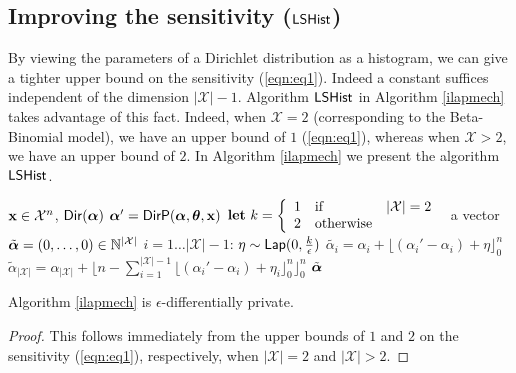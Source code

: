 \documentclass{article}
\begin{document}
\subsection{Improving the sensitivity ($\ilapmech$)}
\label{sec_ell1_hist}
By viewing the parameters of a Dirichlet distribution as a histogram, we can give a tighter upper bound on the sensitivity (\ref{eqn:eq1}).
Indeed a constant suffices independent of the dimension $|\mathcal{X}| - 1$. Algorithm $\ilapmech$ in Algorithm \ref{ilapmech} takes advantage of this fact. 
Indeed, when $\mathcal{X}=2$ (corresponding to the Beta-Binomial model), we have an upper bound of $1$ (\ref{eqn:eq1}), whereas when $\mathcal{X}>2$, we have an upper bound of $2$.
In Algorithm \ref{ilapmech} we present the algorithm $\ilapmech$.
\begin{algorithm}
  \caption{$\ilapmech$}
  \label{ilapmech}
  \begin{algorithmic}
  \INPUT $\textbf{x}\in\mathcal{X}^n$, $\mathsf{Dir}(\boldsymbol{\alpha})$
  \STATE {} $\boldsymbol{\alpha}' = \mathsf{DirP}(\boldsymbol{\alpha},\boldsymbol{\theta},\textbf{x})$
  \STATE \quad ${\bf let}\ k=\left \{
        \begin{array}{lll}          
          1&\text{if}& |\mathcal{X}|=2\\
          2&\text{otherwise}
        \end{array}
      \right .\ $
  \STATE {} a vector $\tilde{\boldsymbol{\alpha}} = (0, \dots, 0 )\in \mathbb{N}^{|\mathcal{X}|}$ 
  \STATE {} $i = 1 \dots |\mathcal{X}|-1$:
  \STATE \quad {} $\eta \sim \mathsf{Lap}(0, \frac{k}{\epsilon})$
  \STATE \quad \quad  $\tilde{\alpha_i}=\alpha_i + \lfloor{(\alpha_i' - \alpha_i) + \eta}\rfloor^n_0$ 
  \STATE \quad $\tilde{\alpha}_{|\mathcal{X}|} = \alpha_{|\mathcal{X}|} + \lfloor n - \sum_{i = 1}^{|\mathcal{X}|-1}\lfloor{(\alpha_i' - \alpha_i) + \eta_i}\rfloor^n_0 \rfloor^n_0$
   $\tilde{\boldsymbol{\alpha}}$
  \end{algorithmic}
\end{algorithm}
\begin{lem}
  Algorithm \ref{ilapmech} is $\epsilon$-differentially private.
  \begin{proof} This follows immediately from the upper bounds of $1$ and $2$ on the sensitivity (\ref{eqn:eq1}), respectively, when $|\mathcal{X}|=2$ and $|\mathcal{X}|>2$.
  \end{proof}
\end{lem}
\end{document}
